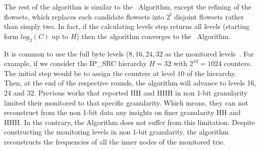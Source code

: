 The rest of the algorithm is similar to the ~\simpleAlgo Algorithm, except the refining of the flowsets, which replaces each candidate flowsets into $2^l$ disjoint flowsets rather than simply two. In fact, if the calculating levels step returns all levels (starting form $log_2(C)$ up to $H$) then the algorithm converges to the ~\simpleAlgo Algorithm.

It is common to use the full byte levels ($8, 16, 24,32$ as the monitored levels~\cite{MST, BenBasat2017}.   For example, if we consider the IP\_SRC hierarchy $H=32$ with $2^{10}=1024$ counters. The initial step would be to assign the counters at level $10$ of the hierarchy. Then, at the end of the respective rounds, the algorithm will advance to levels 16, 24 and 32.
Previous works that reported HH and HHH in non 1-bit granularity limited their monitored to that specific granularity. Which means, they can not reconstruct from the non 1-bit data any insights on finer granularity HH and HHH. In the contrary, the \multipleAlgo Algorithm does not suffer from this limitation. Despite constructing the monitoring levels in non 1-bit granularity, the algorithm reconstructs the frequencies of all the inner nodes of the monitored trie.


